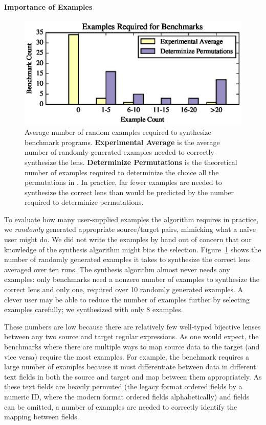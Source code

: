 \documentclass[sigplan,acmsmall]{acmart}
\begin{document}
\paragraph*{Importance of Examples}

\begin{figure}
  \centering
  \includegraphics{generated-graphs/examples.eps}
  \caption{Average number of random examples required to synthesize benchmark
    programs.  {\bf Experimental Average} is the average number of randomly
    generated examples needed to correctly synthesize the lens.  {\bf
      Determinize Permutations} is the theoretical number of examples required
    to determinize the choice all the permutations in \RigidSynth{}.
    In practice, far fewer examples are
    needed to synthesize the correct lens than would be predicted by the number
    required to determinize permutations.}
  \label{fig:exs-reqd}
\end{figure}

To evaluate how many user-supplied examples the algorithm requires in
practice, we \textit{randomly} generated appropriate source/target
pairs, mimicking what a na\"{i}ve user might do.  We did not write the
examples by hand out of concern that our knowledge of the synthesis
algorithm might bias the selection. Figure~\ref{fig:exs-reqd} shows
the number of randomly generated examples it takes to synthesize the
correct lens averaged over ten runs.  The synthesis algorithm almost never needs
any examples: only \ExamplesRequiringNonzeroExamples{} benchmarks need a nonzero number of examples to
synthesize the correct lens and only one,  required over
10 randomly generated examples.
A clever user may be able to reduce the
number of examples further by selecting examples carefully; we
synthesized  with only 8 examples.

These numbers are low because there are relatively few well-typed
bijective lenses between any two source and target regular expressions. 
As one would expect, the benchmarks where there are multiple ways to
map source data to the target (and vice versa) require the most examples.
For example, the benchmark  requires a large number of
examples because it
must differentiate between data in different text fields in both the
source and target and map between them appropriately.  As these text fields are
heavily permuted
(the legacy format ordered fields by a numeric ID, where
the modern format ordered fields alphabetically) and fields can be
omitted, a number of examples are needed to correctly identify the mapping
between fields.
\end{document}
